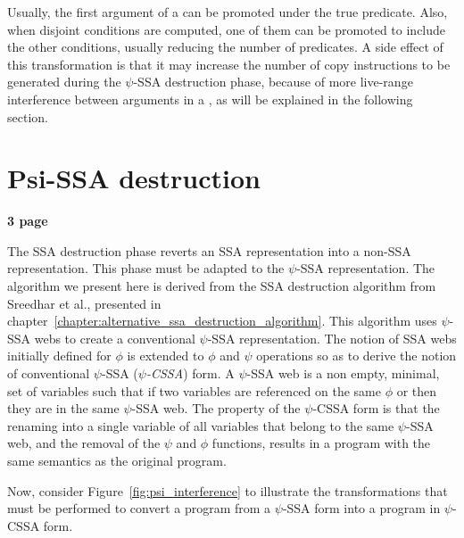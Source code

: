 Usually, the first argument of a \psifun can be promoted
under the {true} predicate. Also, when disjoint conditions are
computed, one of them can be promoted to include the other conditions,
usually reducing the number of predicates. A side effect of this
transformation is that it may increase the number of copy instructions
to be generated during the $\psi$-SSA destruction phase, because of
more live-range interference between arguments in a \psifun,
as will be explained in the following section.


\section{Psi-SSA destruction}
\label{sec:Psi_ssa_destruction}

\textbf{3 page}


The SSA destruction phase reverts an SSA representation into a non-SSA
representation. This phase must be adapted to the $\psi$-SSA
representation. The algorithm we present here is derived from the SSA
destruction algorithm from Sreedhar et al., presented in
chapter~\ref{chapter:alternative_ssa_destruction_algorithm}. This algorithm uses
$\psi$-SSA webs to create a conventional $\psi$-SSA
representation. The notion of SSA webs initially defined for $\phi$ is
extended to $\phi$ and $\psi$ operations so as to derive the notion of
conventional $\psi$-SSA ({\em $\psi$-CSSA}) form. A $\psi$-SSA web is
a non empty, minimal, set of variables such that if two variables are
referenced on the same $\phi$ or \psifun then they are in the
same $\psi$-SSA web. The property of the $\psi$-CSSA form is that the
renaming into a single variable of all variables that belong to the
same $\psi$-SSA web, and the removal of the $\psi$ and $\phi$
functions, results in a program with the same semantics as the
original program.


Now, consider Figure~\ref{fig:psi_interference} to illustrate the
transformations that must be performed to convert a program from a
$\psi$-SSA form into a program in $\psi$-CSSA form.


